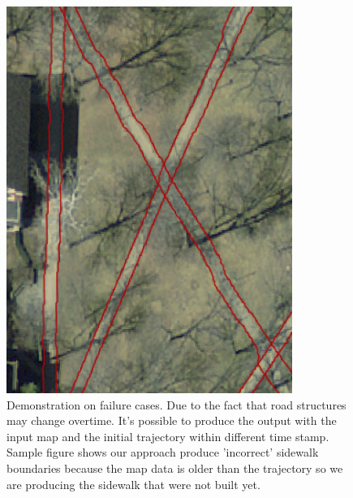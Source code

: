 \begin{figure}
    \centering
    \includegraphics[width=0.83\textwidth]{Figures/oxford_fail_1.png}
    \caption[Failure Case 1]{Demonstration on failure cases. Due to the fact that road structures may change overtime. It's possible to produce the output with the input map and the initial trajectory within different time stamp. Sample figure shows our approach produce 'incorrect' sidewalk boundaries because the map data is older than the trajectory so we are producing the sidewalk that were not built yet.}
    \label{fig:oxford_fail_1}
\end{figure} 

